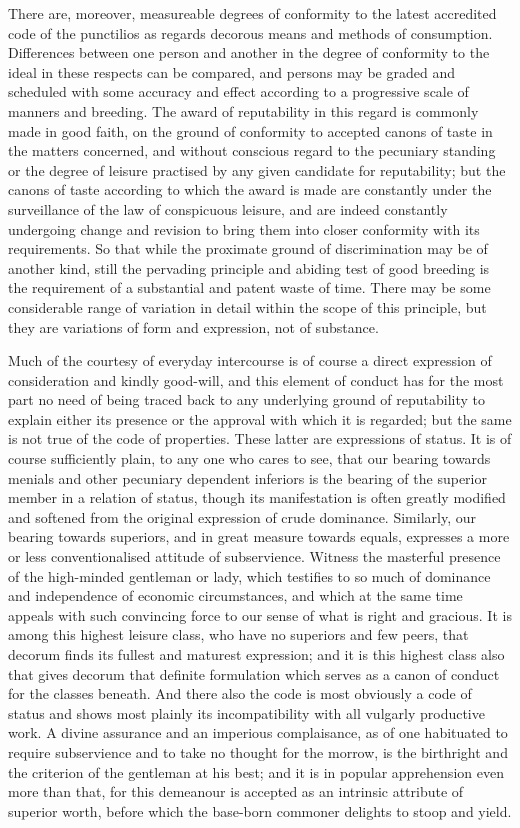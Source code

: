 \documentclass[12pt]{report}
\begin{document}
There are, moreover, measureable degrees of conformity to the latest
accredited code of the punctilios as regards decorous means and methods
of consumption. Differences between one person and another in the
degree of conformity to the ideal in these respects can be compared,
and persons may be graded and scheduled with some accuracy and effect
according to a progressive scale of manners and breeding. The award
of reputability in this regard is commonly made in good faith, on
the ground of conformity to accepted canons of taste in the matters
concerned, and without conscious regard to the pecuniary standing or the
degree of leisure practised by any given candidate for reputability; but
the canons of taste according to which the award is made are constantly
under the surveillance of the law of conspicuous leisure, and are indeed
constantly undergoing change and revision to bring them into closer
conformity with its requirements. So that while the proximate ground of
discrimination may be of another kind, still the pervading principle and
abiding test of good breeding is the requirement of a substantial and
patent waste of time. There may be some considerable range of variation
in detail within the scope of this principle, but they are variations of
form and expression, not of substance.

Much of the courtesy of everyday intercourse is of course a direct
expression of consideration and kindly good-will, and this element
of conduct has for the most part no need of being traced back to any
underlying ground of reputability to explain either its presence or the
approval with which it is regarded; but the same is not true of the code
of properties. These latter are expressions of status. It is of course
sufficiently plain, to any one who cares to see, that our bearing
towards menials and other pecuniary dependent inferiors is the bearing
of the superior member in a relation of status, though its manifestation
is often greatly modified and softened from the original expression of
crude dominance. Similarly, our bearing towards superiors, and in
great measure towards equals, expresses a more or less conventionalised
attitude of subservience. Witness the masterful presence of the
high-minded gentleman or lady, which testifies to so much of dominance
and independence of economic circumstances, and which at the same time
appeals with such convincing force to our sense of what is right and
gracious. It is among this highest leisure class, who have no superiors
and few peers, that decorum finds its fullest and maturest expression;
and it is this highest class also that gives decorum that definite
formulation which serves as a canon of conduct for the classes beneath.
And there also the code is most obviously a code of status and shows
most plainly its incompatibility with all vulgarly productive work. A
divine assurance and an imperious complaisance, as of one habituated
to require subservience and to take no thought for the morrow, is the
birthright and the criterion of the gentleman at his best; and it is in
popular apprehension even more than that, for this demeanour is accepted
as an intrinsic attribute of superior worth, before which the base-born
commoner delights to stoop and yield.
\end{document}
